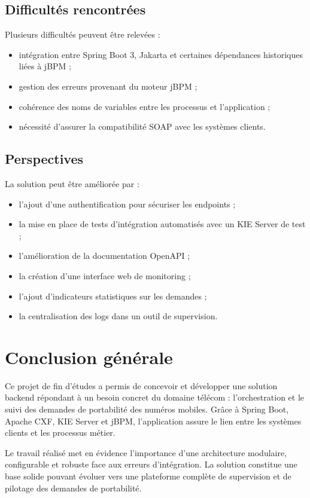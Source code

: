 \documentclass[12pt,a4paper]{report}
\begin{document}
\section{Difficultés rencontrées}
Plusieurs difficultés peuvent être relevées :
\begin{itemize}
    \item intégration entre Spring Boot 3, Jakarta et certaines dépendances historiques liées à jBPM ;
    \item gestion des erreurs provenant du moteur jBPM ;
    \item cohérence des noms de variables entre les processus et l'application ;
    \item nécessité d'assurer la compatibilité SOAP avec les systèmes clients.
\end{itemize}

\section{Perspectives}
La solution peut être améliorée par :
\begin{itemize}
    \item l'ajout d'une authentification pour sécuriser les endpoints ;
    \item la mise en place de tests d'intégration automatisés avec un KIE Server de test ;
    \item l'amélioration de la documentation OpenAPI ;
    \item la création d'une interface web de monitoring ;
    \item l'ajout d'indicateurs statistiques sur les demandes ;
    \item la centralisation des logs dans un outil de supervision.
\end{itemize}

\chapter*{Conclusion générale}
Ce projet de fin d'études a permis de concevoir et développer une solution backend répondant à un besoin concret du domaine télécom : l'orchestration et le suivi des demandes de portabilité des numéros mobiles. Grâce à Spring Boot, Apache CXF, KIE Server et jBPM, l'application assure le lien entre les systèmes clients et les processus métier.

Le travail réalisé met en évidence l'importance d'une architecture modulaire, configurable et robuste face aux erreurs d'intégration. La solution constitue une base solide pouvant évoluer vers une plateforme complète de supervision et de pilotage des demandes de portabilité.
\end{document}
